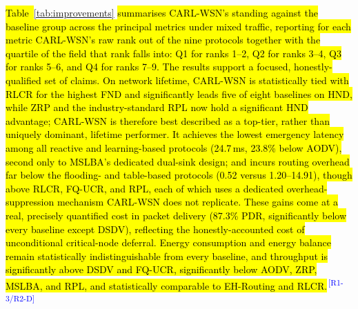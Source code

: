 \documentclass[12pt]{article}
\newcommand{\rtag}[1]{\textsuperscript{\textcolor{blue}{\scriptsize\,[#1]}}}
\newcommand{\hlx}[1]{{\exhyphenpenalty=10000\hyphenpenalty=10000\let\ \nobreakspace\hl{#1}}}
\begin{document}
\hlx{Table~}\ref{tab:improvements}\hlx{ summarises CARL-WSN's standing against
the baseline group across the principal metrics under mixed traffic,
reporting for each metric CARL-WSN's raw rank out of the nine
protocols together with the quartile of the field that rank falls
into: Q1 for ranks 1--2, Q2 for ranks 3--4, Q3 for ranks 5--6, and Q4
for ranks 7--9. The results support a focused, honestly-qualified set
of claims.
On network lifetime, CARL-WSN is statistically tied with RLCR for
the highest FND and significantly leads five of eight baselines on
HND, while ZRP and the industry-standard RPL now hold a significant
HND advantage; CARL-WSN is therefore best described as a top-tier,
rather than uniquely dominant, lifetime performer. It achieves the
lowest emergency latency among all reactive and learning-based
protocols (24.7\,ms, 23.8\% below AODV), second only to MSLBA's
dedicated dual-sink design; and incurs routing overhead far below
the flooding- and table-based protocols (0.52 versus 1.20--14.91),
though above RLCR, FQ-UCR, and RPL, each of which uses a dedicated
overhead-suppression mechanism CARL-WSN does not replicate. These
gains come at a real, precisely quantified cost in packet delivery
(87.3\% PDR, significantly below every baseline except DSDV),
reflecting the honestly-accounted cost of unconditional
critical-node deferral. Energy consumption and energy balance remain
statistically indistinguishable from every baseline, and throughput
is significantly above DSDV and FQ-UCR, significantly below AODV,
ZRP, MSLBA, and RPL, and statistically comparable to EH-Routing and
RLCR.}\rtag{R1-3/R2-D}
\end{document}
